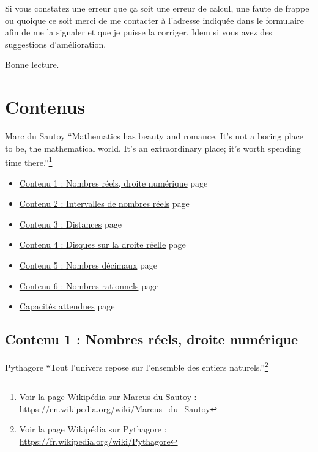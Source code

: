 \documentclass[a4paper,11pt]{book}
\begin{document}
Si vous constatez une erreur que ça soit une erreur de calcul, une
faute de frappe ou quoique ce soit merci de me contacter à l'adresse
indiquée dans le formulaire afin de me la signaler et que je puisse
la corriger. Idem si vous avez des suggestions d'amélioration.

Bonne lecture.
\clearpage

\part{Contenus}
\label{sec:orge938bac}
\label{org4fcdbf1}
\label{page:sec2contents}

\begin{myquote}{Marc du Sautoy}
\enquote{Mathematics has beauty and romance. It’s not a boring place to be,
the mathematical world. It’s an extraordinary place; it’s worth
spending time there.}\footnote{Voir la page Wikipédia sur Marcus du Sautoy : \url{https://en.wikipedia.org/wiki/Marcus_du_Sautoy}}
\end{myquote}
\clearpage

\label{org2ce8f1f}
\label{page:content-menu}
\begin{itemize}
\item \hyperref[orge386a9d]{Contenu 1 : Nombres réels, droite numérique}
page~\pageref{page:sec2.1content1}
\item \hyperref[org31d1c9a]{Contenu 2 : Intervalles de nombres réels}
page~\pageref{page:sec2.2content2}
\item \hyperref[org0ecf993]{Contenu 3 : Distances}
page~\pageref{page:sec2.3content3}
\item \hyperref[orgbdb89e7]{Contenu 4 : Disques sur la droite réelle}
page~\pageref{page:sec2.4content4}
\item \hyperref[org86f143d]{Contenu 5 : Nombres décimaux}
page~\pageref{page:sec2.5content5}
\item \hyperref[orgee452f1]{Contenu 6 : Nombres rationnels}
page~\pageref{page:sec2.6content6}
\item \hyperref[org9c65356]{Capacités attendues}
page~\pageref{page:sec3capacities}
\end{itemize}

\clearpage

\chapter{Contenu 1 : Nombres réels, droite numérique}
\label{sec:org79fe394}
\label{orge386a9d}
\label{page:sec2.1content1}
\begin{myquote}{Pythagore}
\enquote{Tout l'univers repose sur l'ensemble des entiers naturels.}\footnote{Voir la page Wikipédia sur Pythagore : \url{https://fr.wikipedia.org/wiki/Pythagore}}
\end{myquote}
\end{document}
